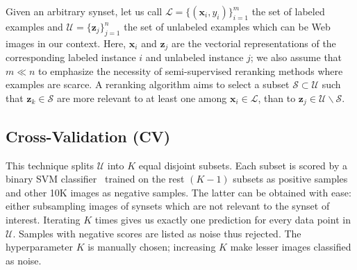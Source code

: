 \documentclass[preprint,12pt]{elsarticle}
\begin{document}
Given an arbitrary synset, let us call $\mathcal{L}=\{ (\mathbf{x}_i, y_i) \}_{i=1}^{m}$ the set of labeled examples and $\mathcal{U} = \{ \mathbf{z}_j \}_{j=1}^{n}$ the set of unlabeled examples which can be Web images in our context. Here, $\mathbf{x}_i$ and $\mathbf{z}_j$ are the vectorial representations of the corresponding labeled instance $i$ and unlabeled instance $j$; we also assume that $m \ll n$ to emphasize the necessity of semi-supervised reranking methods where examples are scarce. A reranking algorithm aims to select a subset $\mathcal{S} \subset \mathcal{U}$ such that $\mathbf{z}_k \in \mathcal{S}$ are more relevant to at least one among $\mathbf{x}_i \in \mathcal{L}$, than to $\mathbf{z}_j\in\mathcal{U} \backslash \mathcal{S}$.

\subsection{Cross-Validation (CV)} 
\noindent This technique splits $\mathcal{U}$ into $K$ equal disjoint subsets. Each subset is scored by a binary SVM classifier~\cite{cortes1995support} trained on the rest $(K-1)$ subsets as positive samples and other 10K images as negative samples. The latter can be obtained with ease: either subsampling images of synsets which are not relevant to the synset of interest. Iterating $K$ times gives us exactly one prediction for every data point in $\mathcal{U}$. Samples with negative scores are listed as noise thus rejected. The hyperparameter $K$ is manually chosen; increasing $K$ make lesser images classified as noise.
\end{document}
